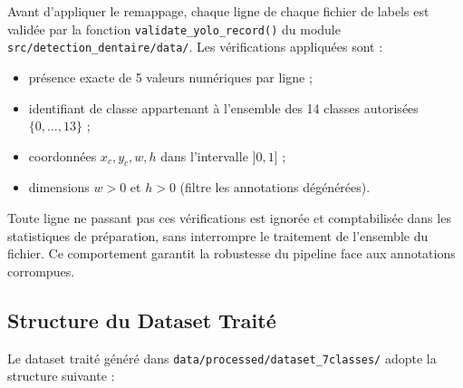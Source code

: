 \documentclass{rapportENSIAS}
\newcommand{\projectpath}[1]{\texttt{#1}}
\begin{document}
Avant d'appliquer le remappage, chaque ligne de chaque fichier de labels
est validée par la fonction \texttt{validate\_yolo\_record()} du module
\projectpath{src/detection\_dentaire/data/}. Les vérifications appliquées sont :

\begin{itemize}
    \item présence exacte de 5 valeurs numériques par ligne ;
    \item identifiant de classe appartenant à l'ensemble des 14 classes autorisées
          $\{0, \ldots, 13\}$ ;
    \item coordonnées $x_c, y_c, w, h$ dans l'intervalle $]0, 1]$ ;
    \item dimensions $w > 0$ et $h > 0$ (filtre les annotations dégénérées).
\end{itemize}

Toute ligne ne passant pas ces vérifications est ignorée et comptabilisée dans
les statistiques de préparation, sans interrompre le traitement de l'ensemble
du fichier. Ce comportement garantit la robustesse du pipeline face aux
annotations corrompues.

\subsection{Structure du Dataset Traité}

Le dataset traité généré dans \projectpath{data/processed/dataset\_7classes/}
adopte la structure suivante :
\end{document}
